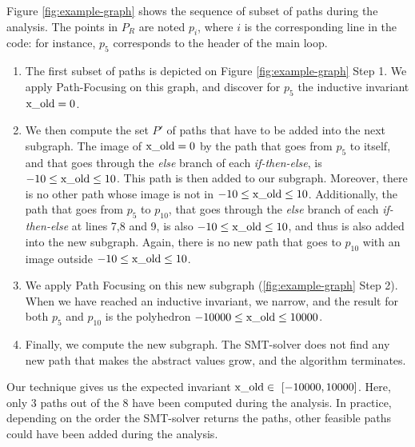 \documentclass[preprint]{sigplanconf}
\begin{document}
Figure \ref{fig:example-graph} shows the sequence of subset of paths during the
analysis. The points in $P_R$ are noted $p_i$, where $i$ is the corresponding
line in the code: for instance, $p_5$ corresponds to the header of the main
loop.

\begin{enumerate}
	\item The first subset of paths is depicted on Figure
		\ref{fig:example-graph} Step 1. We apply Path-Focusing on this graph,
		and discover for $p_5$ the inductive invariant $\lstinline|x_old| = 0$.
	\item
		We then compute the set $P'$ of paths that have to be added into the
		next subgraph. 
		The image of $\lstinline|x_old| = 0$ by the path that goes from $p_5$ to
		itself, and that goes through the \emph{else} branch of each 
		\emph{if-then-else}, is $-10 \leq \lstinline|x_old| \leq 10$. This path
		is then added to our subgraph. Moreover, there is no other path whose
		image is not in $-10 \leq \lstinline|x_old| \leq 10$.
		Additionally, the path that goes from $p_5$ to
		$p_{10}$, that goes through the \emph{else} branch of each 
		\emph{if-then-else} at lines 7,8 and 9, is also 
		$-10 \leq \lstinline|x_old| \leq 10$, and thus is also added into the
		new subgraph. Again, there is no new path that goes to $p_{10}$ with an
		image outside $-10 \leq \lstinline|x_old| \leq 10$.
	\item
		We apply Path Focusing on this new subgraph (\ref{fig:example-graph}
		Step 2). When we have reached an inductive invariant, we narrow, and the
		result for both $p_5$ and $p_{10}$ is the polyhedron 
		$-10000 \leq \lstinline|x_old| \leq 10000$.
	\item Finally, we compute the new subgraph. The SMT-solver does not find any
		new path that makes the abstract values grow, and the algorithm
		terminates.
\end{enumerate}

Our technique gives us the expected invariant 
$\lstinline|x_old| \in~[-10000,\allowbreak 10000]$. 
Here, only 3 paths out of the 8 have been computed during the analysis. In
practice, depending on the order the SMT-solver returns the paths, other
feasible paths could have been added during the analysis.
\end{document}

